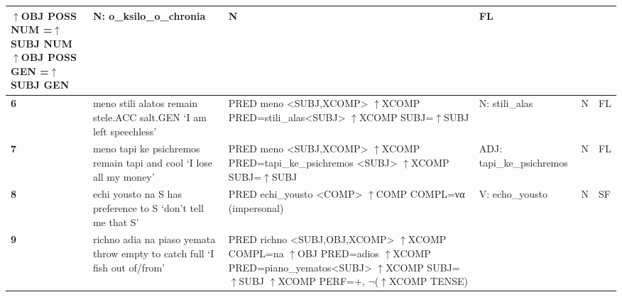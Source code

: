 \documentclass[output=paper]{langsci/langscibook}
\begin{document}
\begin{table}[htbp]
{\begin{tabular}{l@{~}p{5.6cm}p{6.4cm}p{3.3cm}ll}
  $\uparrow$OBJ POSS NUM =$\uparrow$SUBJ NUM \newline
  $\uparrow$OBJ POSS GEN =$\uparrow$SUBJ GEN
  &
  N: \newline
  o\_ksilo\_o\_chronia
  &
  N
  &
  FL
  \\
  \hline
  \textbf{6}
  &
  meno stili alatos \newline
  remain stele.ACC salt.GEN \newline
  `I am left speechless’
  &
  PRED meno <SUBJ,XCOMP> \newline
  $\uparrow$XCOMP PRED=stili\_alas<SUBJ> \newline
  $\uparrow$XCOMP SUBJ=$\uparrow$SUBJ
  &
  N: \newline
  stili\_alas
  &
  N
  &
  FL
  \\
  \hline
  \textbf{7}
  &
  meno tapi ke psichremos \newline
  remain tapi and cool \newline
  `I lose all my money’
  &
  PRED meno <SUBJ,XCOMP> \newline
  $\uparrow$XCOMP PRED=tapi\_ke\_psichremos \newline
  <SUBJ> \newline
  $\uparrow$XCOMP SUBJ=$\uparrow$SUBJ
  &
  ADJ: \newline
  tapi\_ke\_psichremos
  &
  N
  &
  FL
  \\
  \hline
  \textbf{8}
  &
  echi yousto na S \newline
  has preference to S \newline
  `don’t tell me that S’
  &
  PRED echi\_yousto <COMP> \newline
  $\uparrow$COMP COMPL=να \newline
  (impersonal)
  &
  V: \newline
  echo\_yousto
  &
  N
  &
  SF
  \\
  \hline
  \textbf{9}
  &
  richno adia na piaso yemata \newline
  throw empty to catch full \newline
  `I fish out of/from’
  &
  PRED richno <SUBJ,OBJ,XCOMP> \newline
  $\uparrow$XCOMP COMPL=na \newline
  $\uparrow$OBJ PRED=adios \newline
  $\uparrow$XCOMP PRED=piano\_yematos<SUBJ> \newline
  $\uparrow$XCOMP SUBJ=$\uparrow$SUBJ \newline
  $\uparrow$XCOMP PERF=+, $\neg$($\uparrow$XCOMP TENSE) 

\end{tabular}}
\end{table}
\end{document}
